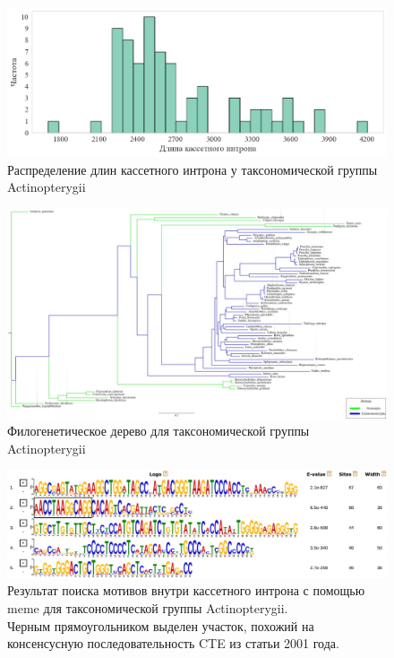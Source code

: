 \newpage
\begin{figure}[h] %
    \centering
    \includegraphics[width=1.0\textwidth]{images/Actinopterygii_intron}
    \caption{Распределение длин кассетного интрона у таксономической группы Actinopterygii}
    \label{fig:Actinopterygii_intron}
\end{figure}


\newpage
\begin{figure}[h] %
    \centering
    \includegraphics[width=1.0\textwidth]{images/Actinopterygii_tree}
    \caption{Филогенетическое дерево для таксономической группы Actinopterygii}
    \label{fig:Actinopterygii_tree}
\end{figure}


\newpage
\begin{figure}[h] %
    \centering
    \includegraphics[width=1.0\textwidth]{images/Actinopterygii_meme_motif}
    \caption{Результат поиска мотивов внутри кассетного интрона с помощью meme для таксономической группы Actinopterygii.\\
    Черным прямоугольником выделен участок, похожий на консенсусную последовательность CTE из статьи 2001 года.}
    \label{fig:Actinopterygii_meme}
\end{figure}


